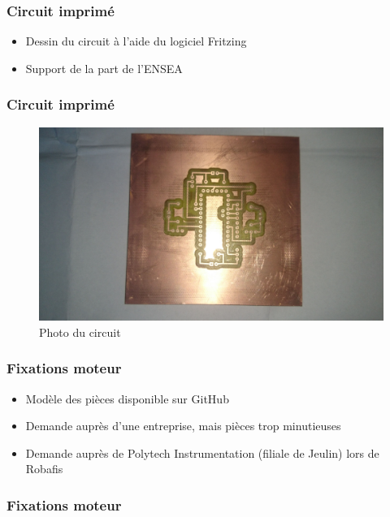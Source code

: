 \documentclass{beamer}
\begin{document}
{	\begin{frame}
	  \frametitle{Circuit imprimé}
	  
	  \begin{itemize}
	    \item Dessin du circuit à l'aide du logiciel Fritzing
	    \item Support de la part de l'ENSEA
	  \end{itemize}
	\end{frame}
	
	\begin{frame}
	  \frametitle{Circuit imprimé}
	
	  \begin{figure}[htbp]
	    \centering
	    \includegraphics[scale=0.05]{img/carte_avant.jpg}
	    \caption{Photo du circuit}
	  \end{figure} 
	\end{frame}
	
	\begin{frame}
	  \frametitle{Fixations moteur}
	  
	  \begin{itemize}
	    \item Modèle des pièces disponible sur GitHub
	    \item Demande auprès d'une entreprise, mais pièces trop minutieuses
	    \item Demande auprès de Polytech Instrumentation (filiale de Jeulin) lors de Robafis
	  \end{itemize}
	\end{frame}

	\begin{frame}
	  \frametitle{Fixations moteur}
	

\end{frame}}
\end{document}

